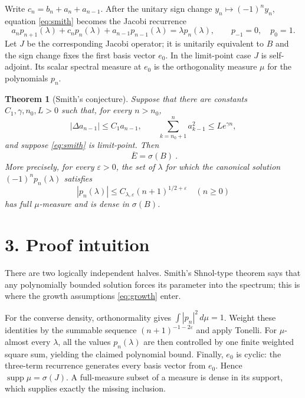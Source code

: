 \documentclass[11pt]{article}
\newtheorem{theorem}{Theorem}
\newcommand{\supp}{\operatorname{supp}}
\begin{document}
Write $c_n=b_n+a_n+a_{n-1}$.  After the unitary sign change $y_n\mapsto(-1)^ny_n$, equation \eqref{eq:smith} becomes the Jacobi recurrence
\begin{equation}\label{eq:jacobi}
 a_np_{n+1}(\lambda)+c_np_n(\lambda)+a_{n-1}p_{n-1}(\lambda)
 =\lambda p_n(\lambda),
 \qquad p_{-1}=0,\quad p_0=1.
\end{equation}
Let $J$ be the corresponding Jacobi operator; it is unitarily equivalent to $B$ and the sign change fixes the first basis vector $e_0$.  In the limit-point case $J$ is self-adjoint.  Its scalar spectral measure at $e_0$ is the orthogonality measure $\mu$ for the polynomials $p_n$.

\begin{theorem}[Smith's conjecture]\label{thm:main}
Suppose that there are constants $C_1,\gamma,n_0,L>0$ such that, for every $n>n_0$,
\begin{equation}\label{eq:growth}
 |\Delta a_{n-1}|\le C_1a_{n-1},
 \qquad
 \sum_{k=n_0+1}^{n}a_{k-1}^2\le Le^{\gamma n},
\end{equation}
and suppose \eqref{eq:smith} is limit-point.  Then
\[
 \boxed{\ \overline E=\sigma(B)\ }.
\]
More precisely, for every $\varepsilon>0$, the set of $\lambda$ for which the canonical solution $(-1)^np_n(\lambda)$ satisfies
\[
 |p_n(\lambda)|\le C_{\lambda,\varepsilon}(n+1)^{1/2+\varepsilon}
 \quad(n\ge0)
\]
has full $\mu$-measure and is dense in $\sigma(B)$.
\end{theorem}

\section*{3. Proof intuition}

There are two logically independent halves.  Smith's Shnol-type theorem says that any polynomially bounded solution forces its parameter into the spectrum; this is where the growth assumptions \eqref{eq:growth} enter.

For the converse density, orthonormality gives $\int |p_n|^2\,d\mu=1$.  Weight these identities by the summable sequence $(n+1)^{-1-2\varepsilon}$ and apply Tonelli.  For $\mu$-almost every $\lambda$, all the values $p_n(\lambda)$ are then controlled by one finite weighted square sum, yielding the claimed polynomial bound.  Finally, $e_0$ is cyclic: the three-term recurrence generates every basis vector from $e_0$.  Hence $\supp\mu=\sigma(J)$.  A full-measure subset of a measure is dense in its support, which supplies exactly the missing inclusion.
\end{document}
